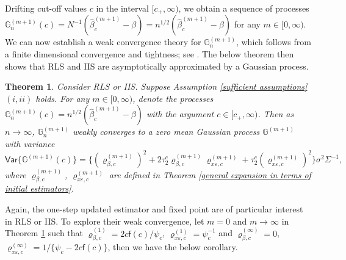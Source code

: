 \documentclass[11pt, letterpaper]{article}
\newtheorem{theorem}{Theorem}
\numberwithin{algorithm}{section}
\numberwithin{assumption}{section}
\numberwithin{lemma}{section}
\numberwithin{theorem}{section}
\numberwithin{corollary}{section}
\numberwithin{remark}{section}
\numberwithin{equation}{section}
\numberwithin{figure}{section}
\numberwithin{table}{section}
\begin{document}
Drifting cut-off values $c$ in the interval $[c_{+}, \infty)$, we obtain a sequence of processes $\mathbb{G}_{n}^{(m + 1)}(c) = N^{-1} (\widehat{\beta}_{c}^{(m + 1)} - \beta) = n^{1/2} (\widehat{\beta}_{c}^{(m + 1)} - \beta)$ for any $m \in [0, \infty)$. We can now establish a weak convergence theory for $\mathbb{G}_{n}^{(m + 1)}$, which follows from a finite dimensional convergence and tightness; see \cite{billingsley1968convergence}. The below theorem then shows that RLS and IIS are asymptotically approximated by a Gaussian process.

\begin{theorem} \label{weak convergence for RLS and IIS}
Consider RLS or IIS. Suppose Assumption \ref{sufficient assumptions}$(i, ii)$ holds. For any $m \in [0, \infty)$, denote the processes $\mathbb{G}_{n}^{(m + 1)}(c) = n^{1/2} (\widehat{\beta}_{c}^{(m + 1)} - \beta)$ with the argument $c \in [c_{+}, \infty)$. Then as $n \to \infty$, $\mathbb{G}_{n}^{(m + 1)}$ weakly converges to a zero mean Gaussian process $\mathbb{G}^{(m + 1)}$ with variance
\begin{equation*}
\mathsf{Var} \{ \mathbb{G}^{(m + 1)}(c) \} = \{ (\varrho_{\beta, c}^{(m + 1)})^{2} + 2 \tau_{2}^{c} \varrho_{\beta, c}^{(m + 1)} \varrho_{x \varepsilon, c}^{(m + 1)} + \tau_{2}^{c} (\varrho_{x \varepsilon, c}^{(m + 1)})^{2} \} \sigma^{2} \Sigma^{-1},
\end{equation*}
where $\varrho_{\beta, c}^{(m + 1)}$, $\varrho_{x \varepsilon, c}^{(m + 1)}$ are defined in Theorem \ref{general expansion in terms of initial estimators}.
\end{theorem}

Again, the one-step updated estimator and fixed point are of particular interest in RLS or IIS. To explore their weak convergence, let $m = 0$ and $m \to \infty$ in Theorem \ref{weak convergence for RLS and IIS} such that $\varrho_{\beta, c}^{(1)} = 2 c \mathsf{f}(c) / \psi_{c}$, $\varrho_{x \varepsilon, c}^{(1)} = \psi_{c}^{-1}$ and $\varrho_{\beta, c}^{(\infty)} = 0$, $\varrho_{x \varepsilon, c}^{(\infty)} = 1 / \{ \psi_{c} - 2 c \mathsf{f}(c) \}$, then we have the below corollary.
\end{document}
